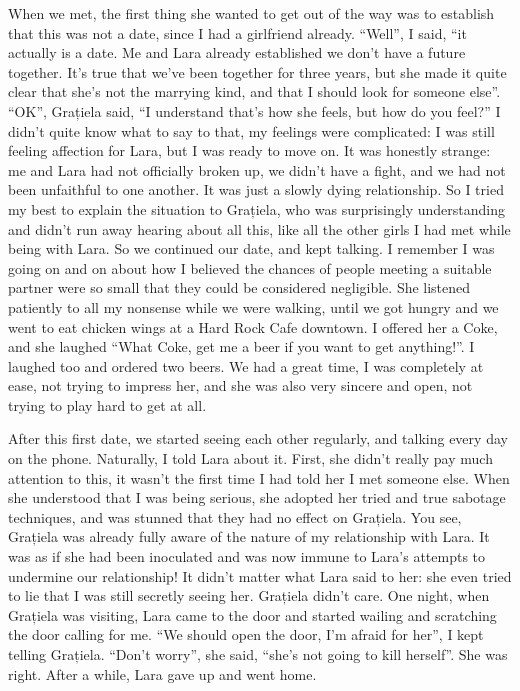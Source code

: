 \documentclass[12pt]{book}
\begin{document}
When we met, the first thing she wanted to get out of the way was to
establish that this was not a date, since I had a girlfriend already.
``Well'', I said, ``it actually is a date. Me and Lara already
established we don't have a future together. It's true that we've been
together for three years, but she made it quite clear that she's not the
marrying kind, and that I should look for someone else''. ``OK'',
Grațiela said, ``I understand that's how she feels, but how do you
feel?'' I didn't quite know what to say to that, my feelings were
complicated: I was still feeling affection for Lara, but I was ready to
move on. It was honestly strange: me and Lara had not officially broken
up, we didn't have a fight, and we had not been unfaithful to one
another. It was just a slowly dying relationship. So I tried my best to
explain the situation to Grațiela, who was surprisingly understanding
and didn't run away hearing about all this, like all the other girls I
had met while being with Lara. So we continued our date, and kept
talking. I remember I was going on and on about how I believed the
chances of people meeting a suitable partner were so small that they
could be considered negligible. She listened patiently to all my
nonsense while we were walking, until we got hungry and we went to eat
chicken wings at a Hard Rock Cafe downtown. I offered her a Coke, and
she laughed ``What Coke, get me a beer if you want to get anything!''. I
laughed too and ordered two beers. We had a great time, I was completely
at ease, not trying to impress her, and she was also very sincere and
open, not trying to play hard to get at all.

After this first date, we started seeing each other regularly, and
talking every day on the phone. Naturally, I told Lara about it. First,
she didn't really pay much attention to this, it wasn't the first time I
had told her I met someone else. When she understood that I was being
serious, she adopted her tried and true sabotage techniques, and was
stunned that they had no effect on Grațiela. You see, Grațiela was
already fully aware of the nature of my relationship with Lara. It was
as if she had been inoculated and was now immune to Lara's attempts to
undermine our relationship! It didn't matter what Lara said to her: she
even tried to lie that I was still secretly seeing her. Grațiela didn't
care. One night, when Grațiela was visiting, Lara came to the door and
started wailing and scratching the door calling for me. ``We should open
the door, I'm afraid for her'', I kept telling Grațiela. ``Don't
worry'', she said, ``she's not going to kill herself''. She was right.
After a while, Lara gave up and went home.
\end{document}
